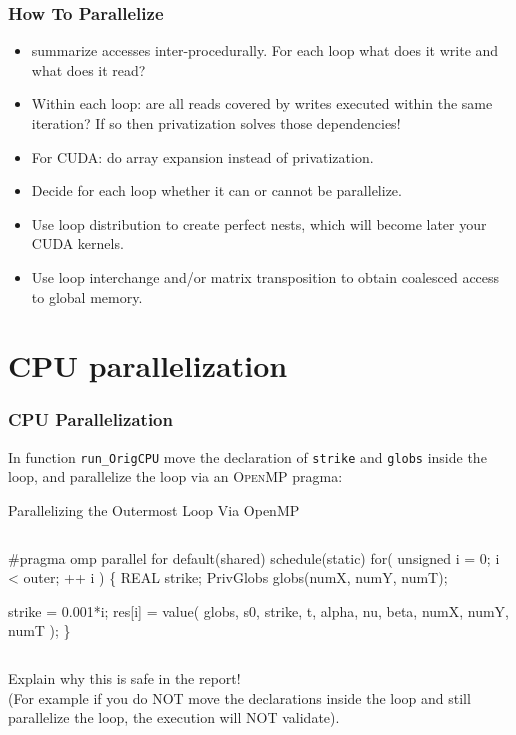 \documentclass{beamer}
\newcommand{\emphh}[1]{\textcolor{CosGreen}{ #1}}
\begin{document}
\begin{frame}[fragile,t]
  \frametitle{How To Parallelize} %

\begin{itemize}
    \item summarize accesses inter-procedurally. 
            For each loop what does it write and what does it read?\medskip
    \item Within each loop: are all reads covered by writes
            executed within the same iteration?
            If so then privatization solves those dependencies!\medskip
    \item For CUDA: do array expansion instead of privatization.\medskip
    \item Decide for each loop whether it can or cannot be parallelize.\medskip
    \item Use loop distribution to create perfect nests,
            which will become later your CUDA kernels.\medskip
    \item Use loop interchange and/or matrix transposition
            to obtain coalesced access to global memory.
\end{itemize}
\end{frame}

\section{CPU parallelization}

\begin{frame}[fragile]
	\tableofcontents[currentsection]
\end{frame}

\begin{frame}[fragile,t]
  \frametitle{CPU Parallelization} %

In function {\tt run\_OrigCPU} move the declaration of
{\tt strike} and {\tt globs} inside the loop, and parallelize
the loop via an \textsc{OpenMP} pragma:

\begin{block}{Parallelizing the Outermost Loop Via OpenMP}
\begin{columns}
\begin{colorcode}
\emphh{\#pragma omp parallel for default(shared) schedule(static)}
    for( unsigned i = 0; i < outer; ++ i ) \{
        REAL strike;
        PrivGlobs    globs(numX, numY, numT);

        strike = 0.001*i;
        res[i] = value( globs, s0, strike, t,
                        alpha, nu,    beta,
                        numX,  numY,  numT );
    \}
\end{colorcode}
\end{columns}
\end{block} 

\alert{Explain why this is safe in the report!}\\
(For example if you do NOT move the declarations inside
the loop and still parallelize the loop, the execution
will NOT validate).

\end{frame}
\end{document}
